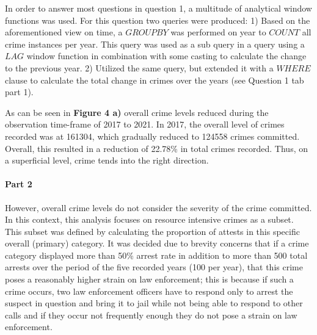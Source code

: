 \documentclass[a4paper]{article}
\begin{document}
In order to answer most questions in question 1, a multitude of analytical window functions was used. For this question two queries were produced: 1) Based on the aforementioned view on time, a $GROUP BY$ was performed on year to $COUNT$ all crime instances per year. This query was used as a sub query in a query using a $LAG$ window function in combination with some casting to calculate the change to the previous year. 2) Utilized the same query, but extended it with a $WHERE$ clause to calculate the total change in crimes over the years (see Question 1 tab part 1).

As can be seen in \textbf{Figure 4 a)} overall crime levels reduced during the observation time-frame of 2017 to 2021. In 2017, the overall level of crimes recorded was at 161304, which gradually reduced to 124558 crimes committed. Overall, this resulted in a reduction of 22.78\% in total crimes recorded. Thus, on a superficial level, crime tends into the right direction. 


\paragraph{Part 2} However, overall crime levels do not consider the severity of the crime committed. In this context, this analysis focuses on resource intensive crimes as a subset. This subset was defined by calculating the proportion of attests in this specific overall (primary) category. It was decided due to brevity concerns that if a crime category displayed more than 50\% arrest rate in addition to more than 500 total arrests over the period of the five recorded years (100 per year), that this crime poses a reasonably higher strain on law enforcement; this is because if such a crime occurs, two law enforcement officers have to respond only to arrest the suspect in question and bring it to jail while not being able to respond to other calls and if they occur not frequently enough they do not pose a strain on law enforcement. 
\end{document}
